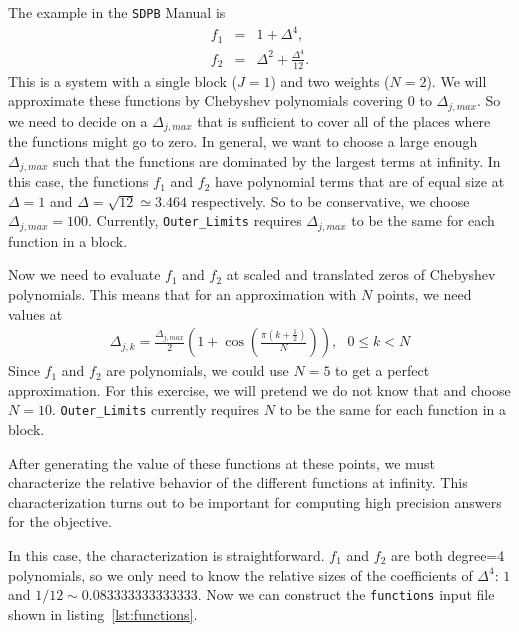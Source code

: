 \documentclass[12pt]{article}
\numberwithin{equation}{section}
\begin{document}
The example in the \texttt{SDPB} Manual is
\begin{eqnarray}
  f_1 & = & 1 + \Delta^4, \\
  f_2 & = & \Delta^2 + \frac{\Delta^4}{12}.
\end{eqnarray}
This is a system with a single block ($J=1$) and two weights ($N=2$).
We will approximate these functions by Chebyshev polynomials covering
$0$ to $\Delta_{j,max}$.  So we need to decide on a $\Delta_{j,max}$
that is sufficient to cover all of the places where the functions
might go to zero.  In general, we want to choose a large enough
$\Delta_{j,max}$ such that the functions are dominated by the largest
terms at infinity.  In this case, the functions $f_1$ and $f_2$ have
polynomial terms that are of equal size at $\Delta=1$ and
$\Delta=\sqrt{12}\simeq 3.464$ respectively.  So to be conservative,
we choose $\Delta_{j,max}=100$.  Currently, \texttt{Outer\_Limits}
requires $\Delta_{j,max}$ to be the same for each function in a block.

Now we need to evaluate $f_1$ and $f_2$ at scaled and translated zeros
of Chebyshev polynomials.  This means that for an approximation with
$N$ points, we need values at
\begin{eqnarray}
\Delta_{j,k} =  \frac{\Delta_{j,max}}{2} \left(1 + \cos\left({\frac{\pi \left( k + \frac{1}{2} \right)}{N}}\right)\right), \textrm{ } 0 \le k < N
\end{eqnarray}
Since $f_1$ and $f_2$ are polynomials, we could use $N=5$ to get a
perfect approximation.  For this exercise, we will pretend we do not
know that and choose $N=10$.  \texttt{Outer\_Limits}
currently requires $N$ to be the same for each function in a block.

After generating the value of these functions at these points, we must
characterize the relative behavior of the different functions at
infinity.  This characterization turns out to be important for
computing high precision answers for the objective.

In this case, the characterization is straightforward.  $f_1$ and $f_2$
are both degree=4 polynomials, so we only need to know the relative
sizes of the coefficients of $\Delta^4$: $1$ and
$1/12 \sim 0.083333333333333$.  Now we can construct the
\texttt{functions} input file shown in listing~\ref{lst:functions}.
\end{document}
